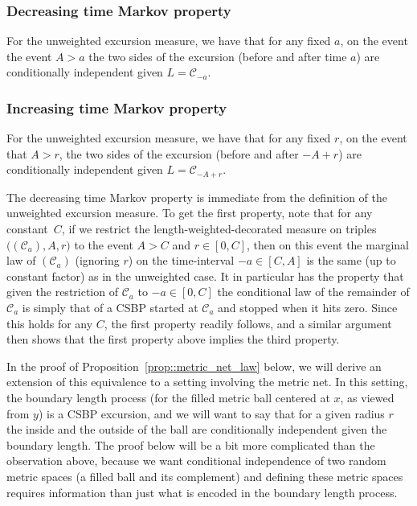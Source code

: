 \documentclass[JEP,XML,SOM,Unicode]{cedram}
\let\mathcal\mathscr
\theoremstyle{plain}
\numberwithin{theorem}{section}
\theoremstyle{definition}
\newcommand{\CC}{{\mathcal C}}
\begin{document}
\subsubsection*{Decreasing time Markov property} For the unweighted excursion measure, we have that for any fixed $a$, on the event the event $A>a$ the two sides of the excursion (before and after time $a$) are conditionally independent given $L = \CC_{-a}$.

\subsubsection*{Increasing time Markov property} For the unweighted excursion measure, we have that for any fixed $r$, on the event that $A>r$, the two sides of the excursion (before and after $-A+r$) are conditionally independent given $L = \CC_{-A+r}$.

\smallskip
The decreasing time Markov property is immediate from the definition of the unweighted excursion measure. To get the first property, note that for any constant~$C$, if we restrict the length-weighted-decorated measure on triples $\bigl((\CC_a), A, r\bigr)$ to the event $A>C$ and $r \in [0,C]$, then on this event the marginal law of $(\CC_a)$ (ignoring $r$) on the time-interval $-a \in [C,A]$ is the same (up to constant factor) as in the unweighted case. It in particular has the property that given the restriction of $\CC_a$ to $-a \in [0,C]$ the conditional law of the remainder of $\CC_a$ is simply that of a CSBP started at $\CC_a$ and stopped when it hits zero. Since this holds for any $C$, the first property readily follows, and a similar argument then shows that the first property above implies the third property.

In the proof of Proposition~\ref{prop::metric_net_law} below, we will derive an extension of this equivalence to a setting involving the metric net. In this setting, the boundary length process (for the filled metric ball centered at $x$, as viewed from $y$) is a CSBP excursion, and we will want to say that for a given radius $r$ the inside and the outside of the ball are conditionally independent given the boundary length. The proof below will be a bit more complicated than the observation above, because we want conditional independence of two random metric spaces (a filled ball and its complement) and defining these metric spaces requires information than just what is encoded in the boundary length process.
\end{document}
